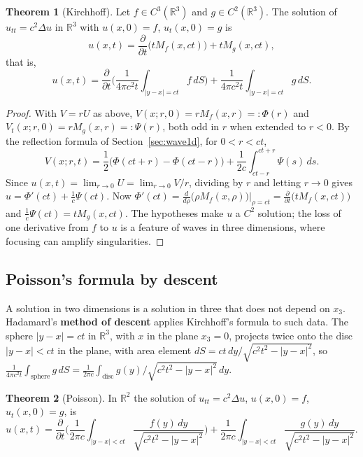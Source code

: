 \documentclass[11pt,a4paper]{article}
\numberwithin{equation}{section}
\theoremstyle{definition}
\newtheorem{thm}{Theorem}[subsection]
\begin{document}
\begin{thm}[Kirchhoff]
\label{thm:kirchhoff}
Let $f \in C^3(\mathbb R^3)$ and $g \in C^2(\mathbb R^3)$. The solution of $u_{tt} = c^2\Delta u$ in $\mathbb R^3$ with $u(x, 0) = f$, $u_t(x, 0) = g$ is
\[
u(x, t) = \frac{\partial}{\partial t}\bigl(tM_f(x, ct)\bigr) + tM_g(x, ct) ,
\]
that is,
\[
u(x, t) = \frac{\partial}{\partial t}\biggl(\frac{1}{4\pi c^2t}\int_{|y - x| = ct}f\,dS\biggr) + \frac{1}{4\pi c^2t}\int_{|y - x| = ct}g\,dS .
\]
\end{thm}

\begin{proof}
With $V = rU$ as above, $V(x; r, 0) = rM_f(x, r) =: \Phi(r)$ and $V_t(x; r, 0) = rM_g(x, r) =: \Psi(r)$, both odd in $r$ when extended to $r < 0$. By the reflection formula of Section~\ref{sec:wave1d}, for $0 < r < ct$,
\[
V(x; r, t) = \frac12\bigl(\Phi(ct + r) - \Phi(ct - r)\bigr) + \frac1{2c}\int_{ct - r}^{ct + r}\Psi(s)\,ds .
\]
Since $u(x, t) = \lim_{r \to 0}U = \lim_{r \to 0}V/r$, dividing by $r$ and letting $r \to 0$ gives $u = \Phi'(ct) + \frac1c\Psi(ct)$. Now $\Phi'(ct) = \frac{d}{d\rho}\bigl(\rho M_f(x, \rho)\bigr)\big|_{\rho = ct} = \frac{\partial}{\partial t}\bigl(tM_f(x, ct)\bigr)$ and $\frac1c\Psi(ct) = tM_g(x, ct)$. The
hypotheses make $u$ a $C^2$ solution; the loss of one derivative from $f$ to $u$ is a feature of waves in three dimensions, where focusing can amplify singularities.
\end{proof}

\subsection{Poisson's formula by descent}
\label{ssec:descent}

A solution in two dimensions is a solution in three that does not depend on $x_3$. Hadamard's \textbf{method of descent} applies Kirchhoff's formula to such data. The sphere $|y - x| = ct$ in $\mathbb R^3$, with $x$ in the plane $x_3 = 0$, projects twice onto the disc $|y - x| < ct$ in the plane, with area element
$dS = ct\,dy/\sqrt{c^2t^2 - |y - x|^2}$, so $\frac1{4\pi c^2t}\int_{\text{sphere}}g\,dS = \frac{1}{2\pi c}\int_{\text{disc}}g(y)/\sqrt{c^2t^2 - |y - x|^2}\,dy$.

\begin{thm}[Poisson]
\label{thm:poisson2d}
In $\mathbb R^2$ the solution of $u_{tt} = c^2\Delta u$, $u(x, 0) = f$, $u_t(x, 0) = g$, is
\[
u(x, t) = \frac{\partial}{\partial t}\biggl(\frac{1}{2\pi c}\int_{|y - x| < ct}\frac{f(y)\,dy}{\sqrt{c^2t^2 - |y - x|^2}}\biggr) + \frac{1}{2\pi c}\int_{|y - x| < ct}\frac{g(y)\,dy}{\sqrt{c^2t^2 - |y - x|^2}} .
\]
\end{thm}
\end{document}
